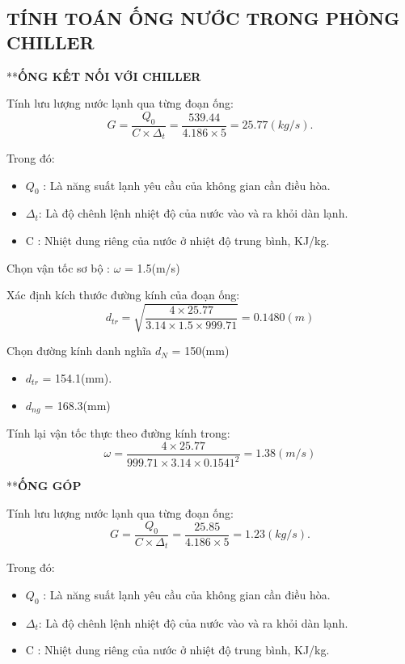 \subsection{TÍNH TOÁN ỐNG NƯỚC TRONG PHÒNG CHILLER}

**\textbf{ỐNG KẾT NỐI VỚI CHILLER}

Tính lưu lượng nước lạnh qua từng đoạn ống:
\begin{equation*}
	G = \dfrac{Q_{0}}{C \times \Delta_{t}} =\dfrac{539.44}{4.186 \times 5} = 25.77(kg/s).
\end{equation*}

Trong đó:
\begin{itemize}
	\item $Q_{0}$ : Là năng suất lạnh yêu cầu của không gian cần điều hòa.
	\item $\Delta_{t}$: Là độ chênh lệnh nhiệt độ của nước vào và ra khỏi dàn lạnh.
	\item C : Nhiệt dung riêng của nước ở nhiệt độ trung bình, KJ/kg.
\end{itemize}

Chọn vận tốc sơ bộ : $\omega$ = 1.5(m/s)

Xác định kích thước đường kính của đoạn ống:
\begin{equation*}
	d_{tr} = \sqrt{\dfrac{4 \times 25.77}{3.14 \times 1.5 \times 999.71}} = 0.1480(m)
\end{equation*}

Chọn đường kính danh nghĩa $d_{N}$ = 150(mm)
\begin{itemize}
	\item $d_{tr}$ = 154.1(mm).
	\item $d_{ng}$ = 168.3(mm)
\end{itemize}

Tính lại vận tốc thực theo đường kính trong:
\begin{equation*}
	\omega = \dfrac{4 \times 25.77 }{999.71 \times 3.14 \times 0.1541^{2}} = 1.38(m/s)
\end{equation*}

**\textbf{ỐNG GÓP}

Tính lưu lượng nước lạnh qua từng đoạn ống:
\begin{equation*}
	G = \dfrac{Q_{0}}{C \times \Delta_{t}} =\dfrac{25.85}{4.186 \times 5} = 1.23(kg/s).
\end{equation*}

Trong đó:
\begin{itemize}
	\item $Q_{0}$ : Là năng suất lạnh yêu cầu của không gian cần điều hòa.
	\item $\Delta_{t}$: Là độ chênh lệnh nhiệt độ của nước vào và ra khỏi dàn lạnh.
	\item C : Nhiệt dung riêng của nước ở nhiệt độ trung bình, KJ/kg.
\end{itemize}

